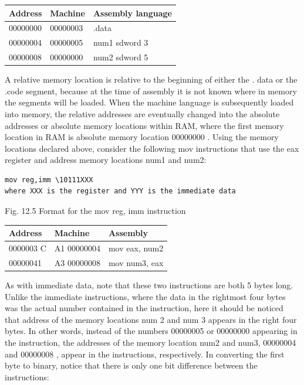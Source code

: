 \documentclass[10pt]{book}
\begin{document}
\begin{center}
\begin{center}
\begin{center}
\begin{center}
\begin{center}
\begin{center}
\begin{tabular}{|l|l|l|}
\hline
Address & Machine & Assembly language \\
\hline\hline
00000000 & 00000003 & .data \\
\hline
00000004 & 00000005 & num1 sdword 3 \\
\hline
00000008 & 00000000 & num2 sdword 5 \\
\hline
\end{tabular}
\end{center}

A relative memory location is relative to the beginning of either the . data or the .code segment, because at the time of assembly it is not known where in memory the segments will be loaded. When the machine language is subsequently loaded into memory, the relative addresses are eventually changed into the absolute addresses or absolute memory locations within RAM, where the first memory location in RAM is absolute memory location 00000000 . Using the memory locations declared above, consider the following mov instructions that use the eax register and address memory locations num1 and num2:

\begin{verbatim}
mov reg,imm \10111XXX 
where XXX is the register and YYY is the immediate data
\end{verbatim}

Fig. 12.5 Format for the mov reg, imm instruction

\begin{center}
\begin{tabular}{|l|l|l|}
\hline
Address & Machine & Assembly \\
\hline
0000003 C & A1 00000004 & mov eax, num2 \\
\hline
00000041 & A3 00000008 & mov num3, eax \\
\hline
\end{tabular}
\end{center}

As with immediate data, note that these two instructions are both 5 bytes long. Unlike the immediate instructions, where the data in the rightmost four bytes was the actual number contained in the instruction, here it should be noticed that address of the memory locations num 2 and num 3 appears in the right four bytes. In other words, instead of the numbers 00000005 or 00000000 appearing in the instruction, the addresses of the memory location num2 and num3, 00000004 and 00000008 , appear in the instructions, respectively. In converting the first byte to binary, notice that there is only one bit difference between the instructions:


\end{center}
\end{center}
\end{center}
\end{center}
\end{center}
\end{document}
